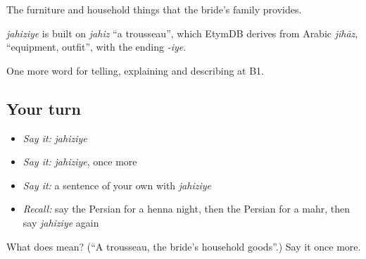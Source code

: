 The furniture and household things that the bride's family provides.

\begin{cousinweb}
\emph{jahiziye} is built on \emph{jahiz} \textquotedblleft{}a trousseau\textquotedblright{}, which EtymDB derives from Arabic \emph{jihāz}, \textquotedblleft{}equipment, outfit\textquotedblright{}, with the ending \emph{-iye}.
\end{cousinweb}

\begin{grammarlens}[title={What you've built}]
One more word for telling, explaining and describing at B1.
\end{grammarlens}

\subsection*{Your turn}
\begin{itemize}
\raggedright
  \item \emph{Say it:} \emph{jahiziye}
  \item \emph{Say it:} \emph{jahiziye}, once more
  \item \emph{Say it:} a sentence of your own with \emph{jahiziye}
  \item \emph{Recall:} say the Persian for a henna night, then the Persian for a mahr, then say \emph{jahiziye} again
\end{itemize}

\begin{tcolorbox}[breakable,colback=teal!4,colframe=teal!35!black,title={Before you move on}]
What does  mean? (\textquotedblleft{}A trousseau, the bride's household goods\textquotedblright{}.) Say it once more.
\end{tcolorbox}
